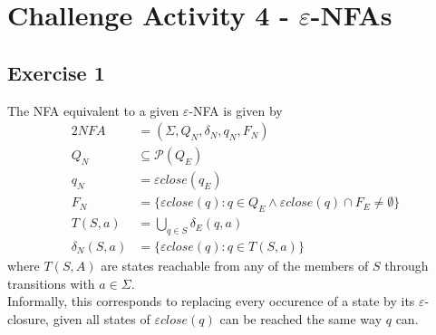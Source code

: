 \setcounter{section}{3}
\section{Challenge Activity 4 - \texorpdfstring{$\varepsilon$}{epsilon}-NFAs}
\subsection{Exercise 1}
The NFA equivalent to a given $\varepsilon$-NFA is given by
\begin{alignat*}{2}
	NFA &= (\Sigma, Q_N, \delta_N, q_N, F_N)\\
	Q_N &\subseteq \mathscr{P}(Q_E)\\
	q_N &= \varepsilon close(q_E)\\
	F_N &= \{\varepsilon close(q)\colon q \in Q_E \wedge \varepsilon close(q) \cap F_E \neq \emptyset\}\\
	T(S,a)&= \bigcup_{q\in S}{\delta_E(q,a)}\\
	\delta_N(S,a) &= \{\varepsilon close(q)\colon q \in T(S,a)\}
\end{alignat*}
where $T(S,A)$ are states reachable from any of the members of $S$ through transitions with $a\in \Sigma$.\\
Informally, this corresponds to replacing every occurence of a state by its $\varepsilon$-closure, given all states of $\varepsilon close(q)$ can be reached the same way $q$ can.
